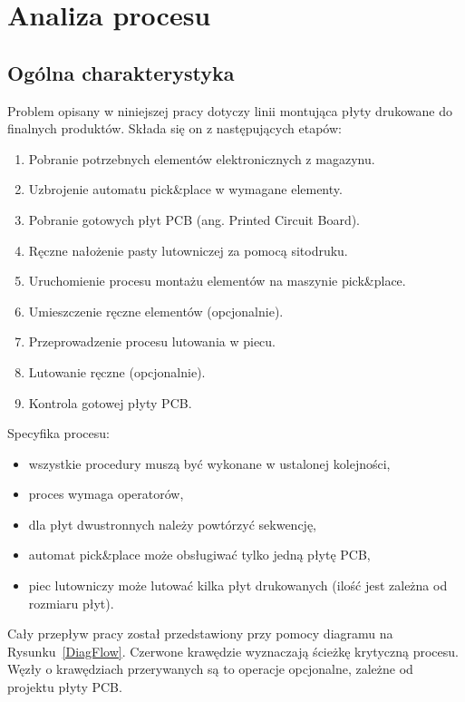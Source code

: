 \chapter{Analiza procesu}

\section{Ogólna charakterystyka}
Problem opisany w  niniejszej pracy dotyczy linii montująca płyty drukowane do finalnych produktów.
Składa się on z następujących etapów:
\begin{enumerate}
	\item Pobranie potrzebnych elementów elektronicznych z magazynu.
	\item Uzbrojenie automatu pick\&place w wymagane elementy.
	\item Pobranie gotowych płyt PCB (ang. Printed Circuit Board).
	\item Ręczne nałożenie pasty lutowniczej za pomocą sitodruku.
	\item Uruchomienie procesu montażu elementów na maszynie pick\&place.
	\item Umieszczenie ręczne elementów (opcjonalnie).
	\item Przeprowadzenie procesu lutowania w piecu.
	\item Lutowanie ręczne (opcjonalnie).
	\item Kontrola gotowej płyty PCB\@.
\end{enumerate}

\breakparagraph{}
Specyfika procesu:
\begin{itemize}
	\item wszystkie procedury muszą być wykonane w ustalonej kolejności,
	\item proces wymaga operatorów,
	\item dla płyt dwustronnych należy powtórzyć sekwencję,
	\item automat pick\&place może obsługiwać tylko jedną płytę PCB,
	\item piec lutowniczy może lutować kilka płyt drukowanych (ilość jest zależna od rozmiaru płyt).
\end{itemize}

Cały przepływ pracy został przedstawiony przy pomocy diagramu na Rysunku~\ref{DiagFlow}.
Czerwone krawędzie wyznaczają ścieżkę krytyczną procesu.
Węzły o krawędziach przerywanych są to operacje opcjonalne, zależne od projektu płyty PCB\@.


